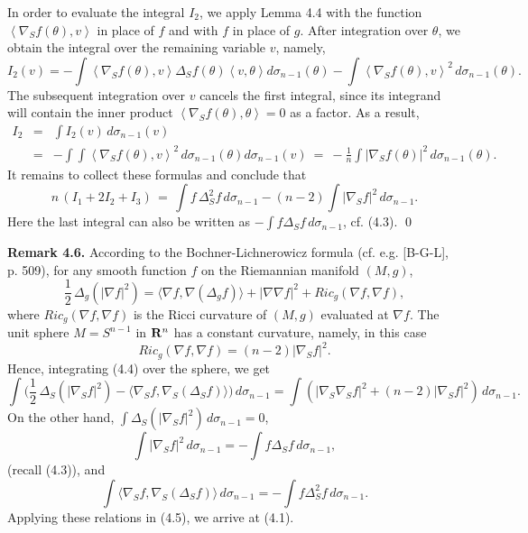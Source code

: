 \documentclass[reqno,12pt]{amsart}
\theoremstyle{plain}
\begin{document}
In order to evaluate the integral $I_2$, we apply Lemma 4.4 with the function
$\left<\nabla_S f(\theta),v\right>$ in place of $f$ and with $f$ in place
of $g$. After integration over $\theta$, we obtain the integral over
the remaining variable $v$, namely,
$$
I_2(v) = -
\int \left<\nabla_S f(\theta),v\right>\Delta_S f(\theta)\left<v,\theta\right> 
d\sigma_{n-1}(\theta) -
\int \left<\nabla_S f(\theta),v\right>^2\,d\sigma_{n-1}(\theta).
$$
The subsequent integration over $v$ cancels the first integral, since 
its integrand will contain the inner product
$\left<\nabla_S f(\theta),\theta\right> = 0$ as a factor. As a result,
\begin{eqnarray*}
I_2 
 & = &
\int I_2(v)\,d\sigma_{n-1}(v) \\ 
 & = &
-\int\!\!\! \int \left<\nabla_S f(\theta),v\right>^2\,d\sigma_{n-1}(\theta)
d\sigma_{n-1}(v) \ = \ 
- \frac{1}{n} \int |\nabla_S f(\theta)|^2\,d\sigma_{n-1}(\theta).
\end{eqnarray*}
It remains to collect these formulas and conclude that
$$
n\,(I_1 + 2 I_2 + I_3) \, = \, \int f\, \Delta^2_S f\, d\sigma_{n-1} - 
(n-2) \int |\nabla_S f|^2\,d\sigma_{n-1}.
$$
Here the last integral can also be written as
$-\int f \Delta_S f\,d\sigma_{n-1}$, cf. (4.3).
\qed

\vskip5mm
{\bf Remark 4.6.}
According to the Bochner-Lichnerowicz formula (cf. e.g. [B-G-L], p. 509), 
for any smooth function $f$ on the Riemannian manifold $(M,g)$,
\begin{equation}
\frac{1}{2}\,\Delta_g(|\nabla f|^2) = 
\langle\nabla f,\nabla (\Delta_g f)\rangle+|\nabla\nabla f|^2 + 
Ric_g(\nabla f,\nabla f),
\end{equation}
where $Ric_g(\nabla f,\nabla f)$ is the Ricci curvature of $(M,g)$ evaluated 
at $\nabla f$. The unit sphere $M = S^{n-1}$ in ${{\bf R}}^n$ has a constant 
curvature, namely, in this case
$$
Ric_g(\nabla f,\nabla f)=(n-2)|\nabla_S f|^2.
$$
Hence, integrating (4.4) over the sphere, we get
\begin{equation}
\int\Big(\frac{1}{2}\, \Delta_S(|\nabla_S f|^2) - 
\langle\nabla_S f,\nabla_S (\Delta_S f)\rangle\Big)\,d\sigma_{n-1} =
\int (|\nabla_S\nabla_S f|^2+(n-2)|\nabla_S f|^2)\,d\sigma_{n-1}.
\end{equation}
On the other hand, $\int\Delta_S(|\nabla_S f|^2)\,d\sigma_{n-1} = 0$, 
$$
\int|\nabla_S f|^2\,d\sigma_{n-1}=-\int f\Delta_S f\,d\sigma_{n-1},
$$
(recall (4.3)), and 
$$
\int\langle\nabla_S f,\nabla_S (\Delta_S f)\rangle\,d\sigma_{n-1} =
-\int f \Delta_S^2 f\,d\sigma_{n-1}.
$$
Applying these relations in (4.5), we arrive at (4.1).
\end{document}
